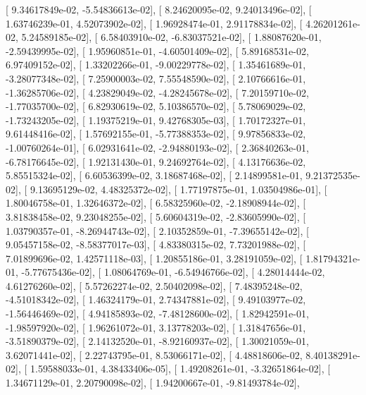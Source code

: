 \documentclass{article}
\begin{document}
       [  9.34617849e-02,  -5.54836613e-02],
       [  8.24620095e-02,   9.24013496e-02],
       [  1.63746239e-01,   4.52073902e-02],
       [  1.96928474e-01,   2.91178834e-02],
       [  4.26201261e-02,   5.24589185e-02],
       [  6.58403910e-02,  -6.83037521e-02],
       [  1.88087620e-01,  -2.59439995e-02],
       [  1.95960851e-01,  -4.60501409e-02],
       [  5.89168531e-02,   6.97409152e-02],
       [  1.33202266e-01,  -9.00229778e-02],
       [  1.35461689e-01,  -3.28077348e-02],
       [  7.25900003e-02,   7.55548590e-02],
       [  2.10766616e-01,  -1.36285706e-02],
       [  4.23829049e-02,  -4.28245678e-02],
       [  7.20159710e-02,  -1.77035700e-02],
       [  6.82930619e-02,   5.10386570e-02],
       [  5.78069029e-02,  -1.73243205e-02],
       [  1.19375219e-01,   9.42768305e-03],
       [  1.70172327e-01,   9.61448416e-02],
       [  1.57692155e-01,  -5.77388353e-02],
       [  9.97856833e-02,  -1.00760264e-01],
       [  6.02931641e-02,  -2.94880193e-02],
       [  2.36840263e-01,  -6.78176645e-02],
       [  1.92131430e-01,   9.24692764e-02],
       [  4.13176636e-02,   5.85515324e-02],
       [  6.60536399e-02,   3.18687468e-02],
       [  2.14899581e-01,   9.21372535e-02],
       [  9.13695129e-02,   4.48325372e-02],
       [  1.77197875e-01,   1.03504986e-01],
       [  1.80046758e-01,   1.32646372e-02],
       [  6.58325960e-02,  -2.18908944e-02],
       [  3.81838458e-02,   9.23048255e-02],
       [  5.60604319e-02,  -2.83605990e-02],
       [  1.03790357e-01,  -8.26944743e-02],
       [  2.10352859e-01,  -7.39655142e-02],
       [  9.05457158e-02,  -8.58377017e-03],
       [  4.83380315e-02,   7.73201988e-02],
       [  7.01899696e-02,   1.42571118e-03],
       [  1.20855186e-01,   3.28191059e-02],
       [  1.81794321e-01,  -5.77675436e-02],
       [  1.08064769e-01,  -6.54946766e-02],
       [  4.28014444e-02,   4.61276260e-02],
       [  5.57262274e-02,   2.50402098e-02],
       [  7.48395248e-02,  -4.51018342e-02],
       [  1.46324179e-01,   2.74347881e-02],
       [  9.49103977e-02,  -1.56446469e-02],
       [  4.94185893e-02,  -7.48128600e-02],
       [  1.82942591e-01,  -1.98597920e-02],
       [  1.96261072e-01,   3.13778203e-02],
       [  1.31847656e-01,  -3.51890379e-02],
       [  2.14132520e-01,  -8.92160937e-02],
       [  1.30021059e-01,   3.62071441e-02],
       [  2.22743795e-01,   8.53066171e-02],
       [  4.48818606e-02,   8.40138291e-02],
       [  1.59588033e-01,   4.38433406e-05],
       [  1.49208261e-01,  -3.32651864e-02],
       [  1.34671129e-01,   2.20790098e-02],
       [  1.94200667e-01,  -9.81493784e-02],
\end{document}
